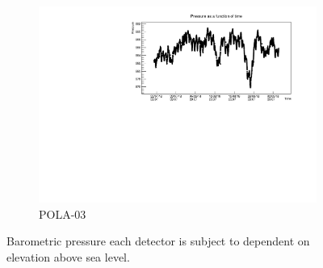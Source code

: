 \documentclass[12pt,a4paper]{amsart}
\begin{document}
\begin{figure}
\begin{subfigure}[b]{0.6\textwidth}
		\includegraphics[width=\textwidth]{../data/plots/POLA-03/pressure_POLA-03.pdf}
		\caption{POLA-03}
		\label{fig:pressure_POLA-03}
	\end{subfigure}
	\caption{Barometric pressure each detector is subject to dependent on elevation above sea level.}
	\label{fig:pressure}
\end{figure}


\printbibliography
\end{document}
